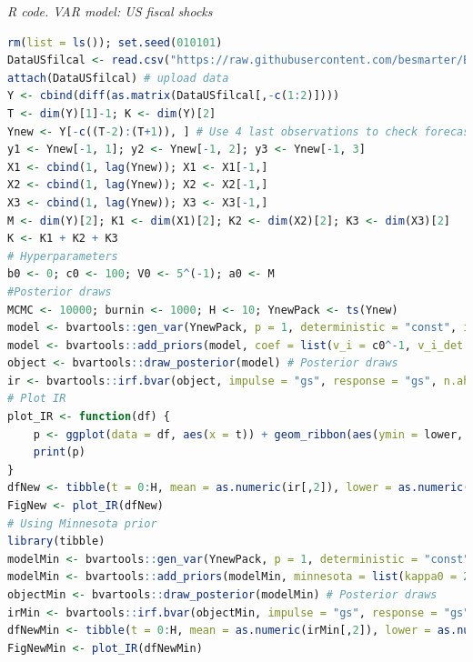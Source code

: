\begin{tcolorbox}[enhanced,width=4.67in,center upper,
	fontupper=\large\bfseries,drop shadow southwest,sharp corners]
	\textit{R code. VAR model: US fiscal shocks}
	\begin{VF}
		\begin{lstlisting}[language=R]
rm(list = ls()); set.seed(010101)
DataUSfilcal <- read.csv("https://raw.githubusercontent.com/besmarter/BSTApp/refs/heads/master/DataApp/18USAfiscal.csv", sep = ",", header = TRUE, quote = "")
attach(DataUSfilcal) # upload data
Y <- cbind(diff(as.matrix(DataUSfilcal[,-c(1:2)])))
T <- dim(Y)[1]-1; K <- dim(Y)[2]
Ynew <- Y[-c((T-2):(T+1)), ] # Use 4 last observations to check forecast
y1 <- Ynew[-1, 1]; y2 <- Ynew[-1, 2]; y3 <- Ynew[-1, 3]
X1 <- cbind(1, lag(Ynew)); X1 <- X1[-1,]
X2 <- cbind(1, lag(Ynew)); X2 <- X2[-1,]
X3 <- cbind(1, lag(Ynew)); X3 <- X3[-1,]
M <- dim(Y)[2]; K1 <- dim(X1)[2]; K2 <- dim(X2)[2]; K3 <- dim(X3)[2] 
K <- K1 + K2 + K3
# Hyperparameters
b0 <- 0; c0 <- 100; V0 <- 5^(-1); a0 <- M
#Posterior draws
MCMC <- 10000; burnin <- 1000; H <- 10; YnewPack <- ts(Ynew)
model <- bvartools::gen_var(YnewPack, p = 1, deterministic = "const", iterations = MCMC, burnin = burnin) # Create model
model <- bvartools::add_priors(model, coef = list(v_i = c0^-1, v_i_det = c0^-1, const = b0), sigma = list(df = a0, scale = V0/a0), coint_var = FALSE) # Add priors
object <- bvartools::draw_posterior(model) # Posterior draws
ir <- bvartools::irf.bvar(object, impulse = "gs", response = "gs", n.ahead = H, type = "feir", cumulative = FALSE) # Calculate IR
# Plot IR
plot_IR <- function(df) {
	p <- ggplot(data = df, aes(x = t)) + geom_ribbon(aes(ymin = lower, ymax = upper), alpha = 1, fill = "lightblue") + geom_line(aes(y = mean), colour = "blue", linewidth = 0.5) + ylab("Impulse response") + xlab("Time") + xlim(0,H)
	print(p)
}
dfNew <- tibble(t = 0:H, mean = as.numeric(ir[,2]), lower = as.numeric(ir[,1]), upper = as.numeric(ir[,3]))
FigNew <- plot_IR(dfNew)
# Using Minnesota prior
library(tibble)
modelMin <- bvartools::gen_var(YnewPack, p = 1, deterministic = "const", iterations = MCMC, burnin = burnin)
modelMin <- bvartools::add_priors(modelMin, minnesota = list(kappa0 = 2, kappa1 = 0.5, kappa3 = 5), coint_var = FALSE) # Minnesota prior
objectMin <- bvartools::draw_posterior(modelMin) # Posterior draws
irMin <- bvartools::irf.bvar(objectMin, impulse = "gs", response = "gs", n.ahead = H, type = "feir", cumulative = FALSE) # Calculate IR
dfNewMin <- tibble(t = 0:H, mean = as.numeric(irMin[,2]), lower = as.numeric(irMin[,1]), upper = as.numeric(irMin[,3]))
FigNewMin <- plot_IR(dfNewMin)
\end{lstlisting}
	\end{VF}
\end{tcolorbox} 

